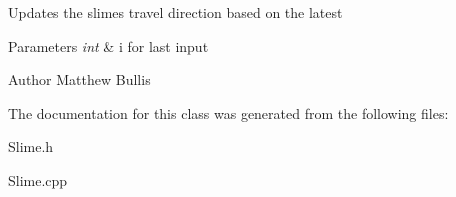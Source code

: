 Updates the slimes travel direction based on the latest 
\begin{DoxyParams}{Parameters}
{\em int} & i for last input \\
\hline
\end{DoxyParams}
\begin{DoxyAuthor}{Author}
Matthew Bullis 
\end{DoxyAuthor}


The documentation for this class was generated from the following files\-:\begin{DoxyCompactItemize}
\item 
Slime.\-h\item 
Slime.\-cpp\end{DoxyCompactItemize}
